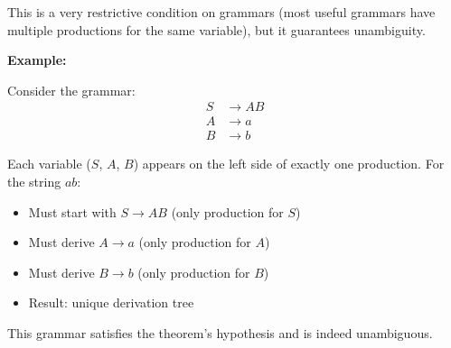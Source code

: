 \documentclass[12pt]{article}
\begin{document}
This is a very restrictive condition on grammars (most useful grammars have multiple productions for the same variable), but it guarantees unambiguity.

\textbf{Example:}

Consider the grammar:
$$\begin{aligned}
S &\rightarrow AB \\
A &\rightarrow a \\
B &\rightarrow b
\end{aligned}$$

Each variable ($S$, $A$, $B$) appears on the left side of exactly one production. For the string $ab$:
\begin{itemize}
\item Must start with $S \rightarrow AB$ (only production for $S$)
\item Must derive $A \rightarrow a$ (only production for $A$)
\item Must derive $B \rightarrow b$ (only production for $B$)
\item Result: unique derivation tree
\end{itemize}

This grammar satisfies the theorem's hypothesis and is indeed unambiguous.
\end{document}
